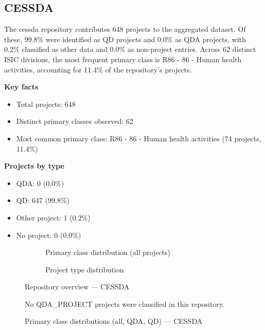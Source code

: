 \clearpage

\subsection{CESSDA}


The cessda repository contributes 648 projects to the aggregated dataset. Of these, 99.8\% were identified as QD projects and 0.0\% as QDA projects, with 0.2\% classified as other data and 0.0\% as non-project entries. Across 62 distinct ISIC divisions, the most frequent primary class is R86 - 86 - Human health activities, accounting for 11.4\% of the repository's projects.


\textbf{Key facts}

\begin{itemize}
    \item Total projects: 648
    \item Distinct primary classes observed: 62
    \item Most common primary class: R86 - 86 - Human health activities (74 projects, 11.4\%)
\end{itemize}

\textbf{Projects by type}

\begin{itemize}
    \item QDA: 0 (0.0\%)
    \item QD: 647 (99.8\%)
    \item Other project: 1 (0.2\%)
    \item No project: 0 (0.0\%)
\end{itemize}

\begin{figure}[H]
    \centering
    \begin{subfigure}[t]{0.49\textwidth}
        \centering
        
        \caption{Primary class distribution (all projects)}
    \end{subfigure}
    \hfill
    \begin{subfigure}[t]{0.49\textwidth}
        \centering
        
        \caption{Project type distribution}
    \end{subfigure}
    \caption{Repository overview --- CESSDA}
\end{figure}

\clearpage

\begin{figure}[H]
    \centering
    
    \par\vspace{0.8em}
    No QDA\_PROJECT projects were classified in this repository.
    \par\vspace{0.8em}
    
    \caption{Primary class distributions (all, QDA, QD) --- CESSDA}
\end{figure}

